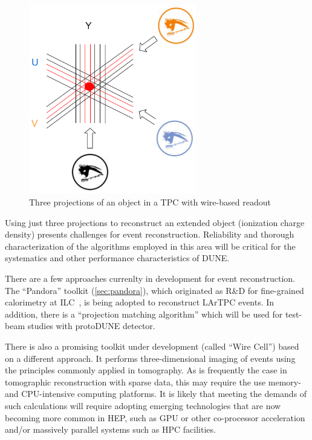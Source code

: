 \begin{figure}[h!]
	\centering
	\includegraphics[width=0.65\textwidth]{uvy_2.png}
	\caption{Three projections of an object in a TPC with wire-based readout}
	\label{fig:3projections}
\end{figure}

Using just three projections to reconstruct an extended object (ionization charge density) presents challenges for event reconstruction.
Reliability and thorough characterization of the algorithms employed in this area will be critical for the systematics and other performance characteristics of DUNE.

There are a few approaches currenlty in development for event reconstruction. The ``Pandora'' toolkit (\ref{sec:pandora}), which
originated as R\&D for fine-grained calorimetry at ILC~\cite{pandora}, is being adopted to reconstruct LArTPC events.
In addition, there is a ``projection matching algorithm'' which will be used for test-beam studies with protoDUNE detector.

There is also a promising toolkit under development (called ``Wire Cell'') based on a different approach.
It performs three-dimensional imaging of events using the principles commonly applied in tomography.
As is frequently the case in tomographic reconstruction with sparse data, this may require the use memory- and CPU-intensive computing platforms.
It is likely that meeting the demands of such calculations will require adopting emerging technologies that are now becoming more common in
HEP, such as GPU or other co-processor acceleration and/or massively parallel systems such as HPC facilities.

